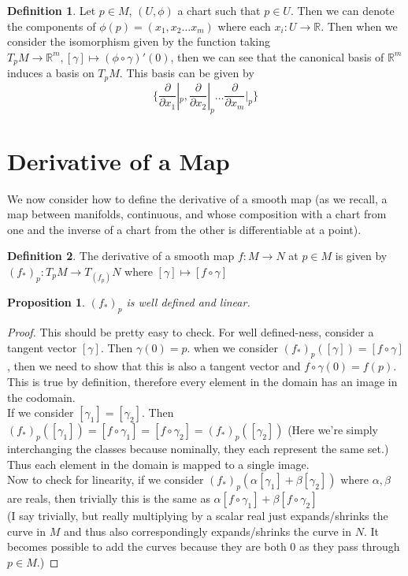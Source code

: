 \documentclass[12pt]{book}
\newtheorem{proposition}{Proposition}[section]
\theoremstyle{definition}
\newtheorem*{definition}{Definition}
\begin{document}
\begin{definition}
    Let $p \in M$, $(U, \phi)$ a chart such that $p \in U$. Then we can denote the components of $\phi(p) = (x_1, x_2 \ldots x_m)$ where each $x_i: U \to \mathbb{R}$. Then when we consider the isomorphism given by the function taking $T_pM \to \mathbb{R}^m, [\gamma] \mapsto (\phi \circ \gamma)'(0)$, then we can see that the canonical basis of $\mathbb{R}^m$ induces a basis on $T_pM$. This basis can be given by $$\{\frac{\partial}{\partial x_1}|_p, \frac{\partial}{\partial x_2}|_p \ldots \frac{\partial}{\partial x_m}|_p\}$$
\end{definition}
\section{Derivative of a Map}
We now consider how to define the derivative of a smooth map (as we recall, a map between manifolds, continuous, and whose composition with a chart from one and the inverse of a chart from the other is differentiable at a point). 
\begin{definition}
    The derivative of a smooth map $f: M \to N$ at $p \in M$ is given by $(f_*)_p: T_pM \to T_(f_p)N$ where $[\gamma] \mapsto [f \circ \gamma]$
\end{definition}
\begin{proposition}
    $(f_*)_p$ is well defined and linear.
\end{proposition}
\begin{proof}
    This should be pretty easy to check. For well defined-ness, consider a tangent vector $[\gamma]$. Then $\gamma(0) = p$. when we consider $(f_*)_p([\gamma]) = [f \circ \gamma]$, then we need to show that this is also a tangent vector and $f \circ \gamma(0) = f(p)$. \\This is true by definition, therefore every element in the domain has an image in the codomain.\\ If we consider $[\gamma_1] = [\gamma_2]$. Then $ (f_*)_p([\gamma_1]) = [f \circ \gamma_1] = [f \circ \gamma_2] = (f_*)_p([\gamma_2])$ (Here we're simply interchanging the classes because nominally, they each represent the same set.) Thus each element in the domain is mapped to a single image.\\ Now to check for linearity, if we consider $(f_*)_p(\alpha[\gamma_1] + \beta[\gamma_2])$ where $\alpha, \beta$ are reals, then trivially this is the same as $\alpha[f \circ \gamma_1] + \beta[f \circ \gamma_2]$\\ (I say trivially, but really multiplying by a scalar real just expands/shrinks the curve in $M$ and thus also correspondingly expands/shrinks the curve in $N$. It becomes possible to add the curves because they are both 0 as they pass through $p \in M$.)
\end{proof}
\end{document}
